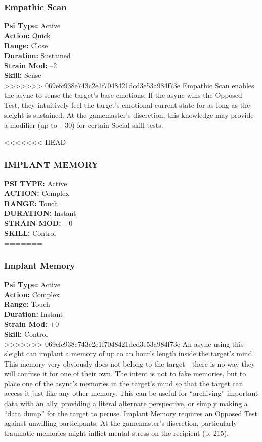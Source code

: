 \subsubsection{Empathic Scan}
\textbf{Psi Type:} Active \\ 
\textbf{Action:} Quick \\ 
\textbf{Range:} Close \\ 
\textbf{Duration:} Sustained \\
\textbf{Strain Mod:} –2 \\ 
\textbf{Skill:} Sense\\
>>>>>>> 069efc938e743c2e1f7048421dcd3e53a984f73e
Empathic Scan enables the async to sense the target’s
base emotions. If the async wins the Opposed Test,
they intuitively feel the target’s emotional current state
for as long as the sleight is sustained. At the gamemaster’s
discretion, this knowledge may provide a modifier
(up to +30) for certain Social skill tests.

<<<<<<< HEAD
\subsubsection{IMPLANT MEMORY}
\textbf{PSI TYPE:} Active \\ 
\textbf{ACTION:} Complex \\ 
\textbf{RANGE:} Touch \\ 
\textbf{DURATION:} Instant \\
\textbf{STRAIN MOD:} +0 \\ 
\textbf{SKILL:} Control\\
=======
\subsubsection{Implant Memory}
\textbf{Psi Type:} Active \\ 
\textbf{Action:} Complex \\ 
\textbf{Range:} Touch \\ 
\textbf{Duration:} Instant \\
\textbf{Strain Mod:} +0 \\ 
\textbf{Skill:} Control\\
>>>>>>> 069efc938e743c2e1f7048421dcd3e53a984f73e
An async using this sleight can implant a memory
of up to an hour’s length inside the target’s mind.
This memory very obviously does not belong to the
target—there is no way they will confuse it for one
of their own. The intent is not to fake memories, but
to place one of the async’s memories in the target’s
mind so that the target can access it just like any other
memory. This can be useful for “archiving” important
data with an ally, providing a literal alternate perspective,
or simply making a “data dump” for the target
to peruse. Implant Memory requires an Opposed Test
against unwilling participants. At the gamemaster’s
discretion, particularly traumatic memories might
inflict mental stress on the recipient (p. 215).

